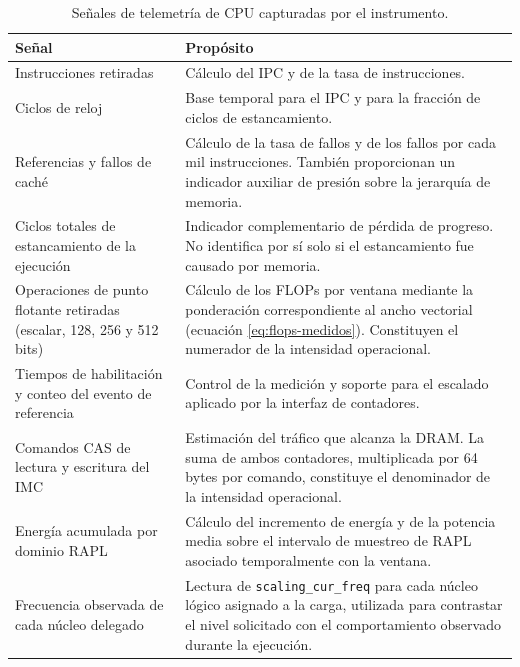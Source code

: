 \documentclass[12pt,oneside,spanish]{book}
\begin{document}
\begin{table}[H]
\centering
\caption[Señales de telemetría de CPU]{Señales de telemetría de CPU capturadas por el instrumento.}
\label{tab:contadores}
\begin{tabular}{@{}p{5.2cm}p{9.3cm}@{}}
\toprule
\textbf{Señal} & \textbf{Propósito} \\
\midrule
Instrucciones retiradas
& Cálculo del IPC y de la tasa de instrucciones. \\

Ciclos de reloj
& Base temporal para el IPC y para la fracción de ciclos de
estancamiento. \\

Referencias y fallos de caché
& Cálculo de la tasa de fallos y de los fallos por cada mil instrucciones.
También proporcionan un indicador auxiliar de presión sobre la jerarquía de
memoria. \\

Ciclos totales de estancamiento de la ejecución
& Indicador complementario de pérdida de progreso. No identifica por sí solo
si el estancamiento fue causado por memoria. \\

Operaciones de punto flotante retiradas (escalar, 128, 256 y 512 bits)
& Cálculo de los FLOPs por ventana mediante la ponderación correspondiente al
ancho vectorial (ecuación \eqref{eq:flops-medidos}). Constituyen el numerador
de la intensidad operacional. \\

Tiempos de habilitación y conteo del evento de referencia
& Control de la medición y soporte para el escalado aplicado por la interfaz
de contadores. \\

Comandos CAS de lectura y escritura del IMC
& Estimación del tráfico que alcanza la DRAM. La suma de ambos contadores,
multiplicada por 64 bytes por comando, constituye el denominador de la
intensidad operacional. \\

Energía acumulada por dominio RAPL
& Cálculo del incremento de energía y de la potencia media sobre el intervalo
de muestreo de RAPL asociado temporalmente con la ventana. \\

Frecuencia observada de cada núcleo delegado
& Lectura de \texttt{scaling\_cur\_freq} para cada núcleo lógico asignado a la
carga, utilizada para contrastar el nivel solicitado con el comportamiento
observado durante la ejecución. \\
\bottomrule
\end{tabular}
\end{table}
\end{document}
